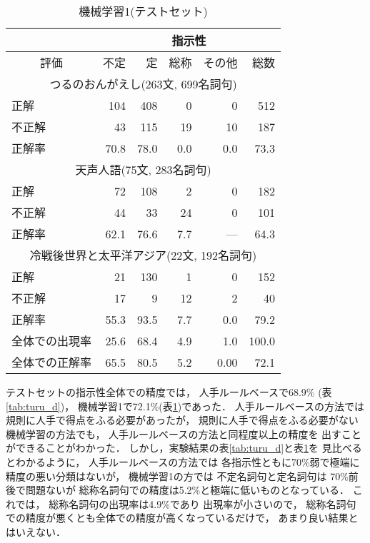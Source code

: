 \begin{table}[t]
\small

\caption{機械学習1(テストセット)}\label{tab:turu_m1}

\begin{center}


{

\begin{tabular}[c]{|l|r|r|r|r|r|} \hline
 & \multicolumn{5}{|c|}{指示性}  \\ \hline 
\multicolumn{1}{|c|}{評価}  &  不定  &  定    &  総称 &  その他 &   総数   \\ \hline 
\multicolumn{6}{|c|}{つるのおんがえし(263文, 699名詞句)} \\ \hline 
   正解   &     104  &     408  &       0  &       0  &     512   \\
  不正解  &      43  &     115  &      19  &      10  &     187   \\\hline
  正解率  &   70.8  &   78.0  &    0.0  &    0.0  &   73.3   \\\hline
\multicolumn{6}{|c|}{天声人語(75文, 283名詞句)} \\ \hline 
   正解   &      72  &     108  &       2  &       0  &     182   \\
  不正解  &      44  &      33  &      24  &       0  &     101   \\\hline
  正解率  &   62.1  &   76.6  &    7.7  &     ---  &   64.3   \\\hline
\multicolumn{6}{|c|}{冷戦後世界と太平洋アジア(22文, 192名詞句)} \\\hline 
   正解   &      21  &     130  &       1  &       0  &     152   \\
  不正解  &      17  &       9  &      12  &       2  &      40   \\\hline
  正解率  &   55.3  &   93.5  &    7.7  &    0.0  &   79.2   \\\hline
全体での出現率 &  25.6  &  68.4  &  4.9    &  1.0   &  100.0 \\
全体での正解率  &   65.5  &   80.5  &    5.2  &    0.00  &   72.1   \\\hline
\end{tabular}
}
\end{center}
\end{table}

テストセットの指示性全体での精度では，
人手ルールベースで68.9\% (表\ref{tab:turu_d})，
機械学習1で72.1\%(表\ref{tab:turu_m1})であった．
人手ルールベースの方法では
規則に人手で得点をふる必要があったが，
規則に人手で得点をふる必要がない
機械学習の方法でも，
人手ルールベースの方法と同程度以上の精度を
出すことができることがわかった．
しかし，実験結果の表\ref{tab:turu_d}と表\ref{tab:turu_m1}を
見比べるとわかるように，
人手ルールベースの方法では
各指示性ともに70\%弱で極端に精度の悪い分類はないが，
機械学習1の方では
不定名詞句と定名詞句は
70\%前後で問題ないが
総称名詞句での精度は5.2\%と極端に低いものとなっている．
これでは，
総称名詞句の出現率は4.9\%であり
出現率が小さいので，
総称名詞句での精度が悪くとも全体での精度が高くなっているだけで，
あまり良い結果とはいえない．

